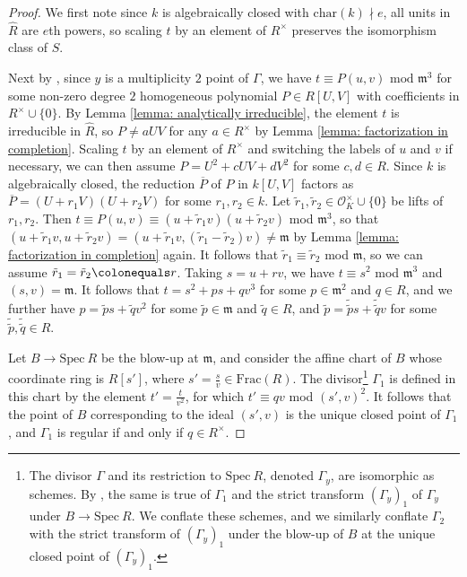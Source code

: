 \documentclass[12pt]{amsart}
\numberwithin{equation}{section}
\theoremstyle{definition}
\renewcommand{\O}{\mathcal{O}}
\newcommand{\Spec}{\mathrm{Spec} \ }
\renewcommand{\c}[1]{\overline{#1}}
\newcommand{\m}{\mathfrak{m}}
\newcommand{\tx}[1]{\text{#1}}
\begin{document}
\begin{proof}
    We first note since $k$ is algebraically closed with $\tx{char}(k)\nmid e$, all units in $\widehat{R}$ are $e$th powers, so scaling $t$ by an element of $R^\times$ preserves the isomorphism class of $S$.

    Next by \cite[Example 9.2.21]{Liu_book}, since $y$ is a multiplicity $2$ point of $\Gamma$, we have $t\equiv P(u,v)\tx{ mod }\m^3$ for some non-zero degree $2$ homogeneous polynomial $P\in R[U,V]$ with coefficients in $R^\times\cup\{0\}$. By Lemma \ref{lemma: analytically irreducible}, the element $t$ is irreducible in $\widehat{R}$, so $P\neq aUV$ for any $a\in R^\times$ by Lemma \ref{lemma: factorization in completion}. Scaling $t$ by an element of $R^\times$ and switching the labels of $u$ and $v$ if necessary, we can then assume $P=U^2+cUV+dV^2$ for some $c,d\in R$. Since $k$ is algebraically closed, the reduction $\c{P}$ of $P$ in $k[U,V]$ factors as $\c{P}=(U+r_1V)(U+r_2V)$ for some $r_1,r_2\in k$. Let $\tilde{r}_1,\tilde{r}_2\in\O_K^\times\cup\{0\}$ be lifts of $r_1,r_2$. %
    Then $t\equiv P(u,v)\equiv (u+\tilde{r}_1v)(u+\tilde{r}_2v)$ mod $\m^3$, so that $(u+\tilde{r}_1v,u+\tilde{r}_2v)=(u+\tilde{r}_1v,(\tilde{r}_1-\tilde{r}_2)v)\neq \m$ by Lemma \ref{lemma: factorization in completion} again. It follows that $\tilde{r}_1\equiv \tilde{r}_2$ mod $\m$, so we can assume $\tilde{r}_1=\tilde{r}_2\colonequals r$. Taking $s=u+rv$, we have $t\equiv s^2$ mod $\m^3$ and $(s,v)=\m$. It follows that $t=s^2+ps+qv^3$ for some $p\in\m^2$ and $q\in R$, and we further have $p=\tilde{p}s+\tilde{q}v^2$ for some $\tilde{p}\in\m$ and $\tilde{q}\in R$, and $\tilde{p}=\tilde{\tilde{p}}s+\tilde{\tilde{q}}v$ for some $\tilde{\tilde{p}},\tilde{\tilde{q}}\in R$.
    
    Let $B\to\Spec R$ be the blow-up at $\m$, and consider the affine chart of $B$ whose coordinate ring is $R[s']$, where $s'=\frac{s}{v}\in\tx{Frac}(R)$. The divisor\footnote{The divisor $\Gamma$ and its restriction to $\Spec R$, denoted $\Gamma_y$, are isomorphic as schemes. By \cite[Tag 0863 (2)]{stacks-project}, the same is true of $\Gamma_1$ and the strict transform $(\Gamma_y)_1$ of $\Gamma_y$ under $B\to\Spec R$. We conflate these schemes, and we similarly conflate $\Gamma_2$ with the strict transform of $(\Gamma_y)_1$ under the blow-up of $B$ at the unique closed point of $(\Gamma_y)_1$.} $\Gamma_1$ is defined in this chart by the element $t'=\frac{t}{v^2}$, for which $t'\equiv qv$ mod $(s',v)^2$. It follows that the point of $B$ corresponding to the ideal $(s',v)$ is the unique closed point of $\Gamma_1$, and $\Gamma_1$ is regular if and only if $q\in R^\times$.


\end{proof}
\end{document}
